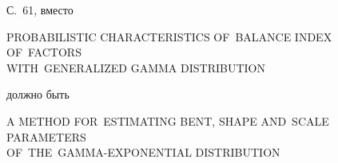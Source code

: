 \noindent
С.~61, вместо 

\bigskip

\noindent
{\large PROBABILISTIC CHARACTERISTICS OF~BALANCE INDEX
OF~FACTORS\\[6pt] 
WITH~GENERALIZED GAMMA DISTRIBUTION}



 



\bigskip

\noindent
должно быть

\bigskip

\noindent
{\large A METHOD FOR~ESTIMATING BENT, SHAPE AND~SCALE PARAMETERS\\[6pt] 
OF~THE~GAMMA-EXPONENTIAL DISTRIBUTION} 



 



 

 \thispagestyle{headings}
 
  

\label{end\stat}

\renewcommand{\bibname}{\protect\rm Литература}  